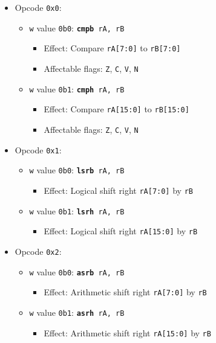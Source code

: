 \documentclass{article}
\begin{document}
	\singlespacing
	\begin{itemize}
	\item Opcode \texttt{0x0}:
		\begin {itemize}
		\item \texttt{w} value \texttt{0b0}:
			\texttt{\textbf{cmpb} rA, rB}
			\begin{itemize}
			\item Effect: Compare \texttt{rA[7:0]} to \texttt{rB[7:0]}
			\item Affectable flags:
				\texttt{Z}, \texttt{C}, \texttt{V}, \texttt{N}
			\end{itemize}
		\item \texttt{w} value \texttt{0b1}:
			\texttt{\textbf{cmph} rA, rB}
			\begin{itemize}
			\item Effect: Compare \texttt{rA[15:0]} to \texttt{rB[15:0]}
			\item Affectable flags:
				\texttt{Z}, \texttt{C}, \texttt{V}, \texttt{N}
			\end{itemize}
		\end{itemize}
	\item Opcode \texttt{0x1}:
		\begin {itemize}
		\item \texttt{w} value \texttt{0b0}:
			\texttt{\textbf{lsrb} rA, rB}
			\begin{itemize}
			\item Effect:
				Logical shift right \texttt{rA[7:0]} by \texttt{rB}
			\end{itemize}
		\item \texttt{w} value \texttt{0b1}:
			\texttt{\textbf{lsrh} rA, rB}
			\begin{itemize}
			\item Effect:
				Logical shift right \texttt{rA[15:0]} by \texttt{rB}
			\end{itemize}
		\end{itemize}
	\item Opcode \texttt{0x2}:
		\begin {itemize}
		\item \texttt{w} value \texttt{0b0}:
			\texttt{\textbf{asrb} rA, rB}
			\begin{itemize}
			\item Effect:
				Arithmetic shift right
				\texttt{rA[7:0]} by \texttt{rB}
			\end{itemize}
		\item \texttt{w} value \texttt{0b1}:
			\texttt{\textbf{asrh} rA, rB}
			\begin{itemize}
			\item Effect:
				Arithmetic shift right
					\texttt{rA[15:0]} by \texttt{rB}
			\end{itemize}
		\end{itemize}
	\end{itemize}
\end{document}

